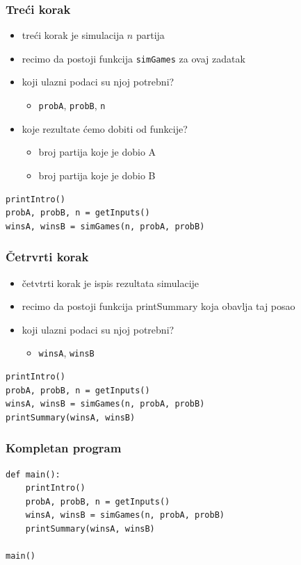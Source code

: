 \documentclass[utf8,compress]{beamer}
\begin{document}
\begin{frame}[fragile]
  \frametitle{Treći korak}
  \begin{itemize}
    \item treći korak je simulacija $n$ partija
    \item recimo da postoji funkcija \texttt{simGames} za ovaj zadatak
    \item koji ulazni podaci su njoj potrebni?
    \begin{itemize}
      \item \texttt{probA}, \texttt{probB}, \texttt{n}
    \end{itemize}
    \item koje rezultate ćemo dobiti od funkcije?
    \begin{itemize}
      \item broj partija koje je dobio A
      \item broj partija koje je dobio B
    \end{itemize}
  \end{itemize}
\begin{verbatim}
printIntro()
probA, probB, n = getInputs()
winsA, winsB = simGames(n, probA, probB)
\end{verbatim}
\end{frame}

\begin{frame}[fragile]
  \frametitle{Četrvrti korak}
  \begin{itemize}
    \item četvtrti korak je ispis rezultata simulacije
    \item recimo da postoji funkcija printSummary koja obavlja taj posao
    \item koji ulazni podaci su njoj potrebni?
    \begin{itemize}
      \item \texttt{winsA}, \texttt{winsB}
    \end{itemize}
  \end{itemize}
\begin{verbatim}
printIntro()
probA, probB, n = getInputs()
winsA, winsB = simGames(n, probA, probB)
printSummary(winsA, winsB)
\end{verbatim}
\end{frame}

\begin{frame}[fragile]
  \frametitle{Kompletan program}
\begin{verbatim}
def main():
    printIntro()
    probA, probB, n = getInputs()
    winsA, winsB = simGames(n, probA, probB)
    printSummary(winsA, winsB)

main()
\end{verbatim}
\end{frame}
\end{document}
